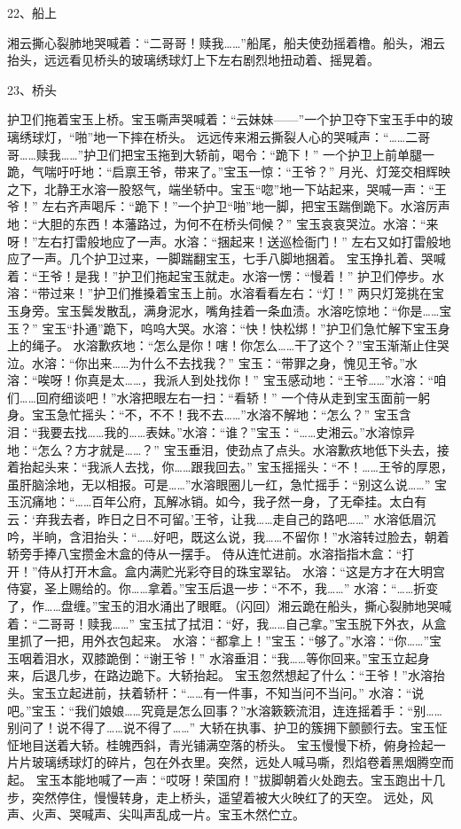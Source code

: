 22、船上\par
湘云撕心裂肺地哭喊着：“二哥哥！赎我……”船尾，船夫使劲摇着橹。船头，湘云抬头，远远看见桥头的玻璃绣球灯上下左右剧烈地扭动着、摇晃着。

23、桥头\par
护卫们拖着宝玉上桥。宝玉嘶声哭喊着：“云妹妹——”一个护卫夺下宝玉手中的玻璃绣球灯，“啪”地一下摔在桥头。
远远传来湘云撕裂人心的哭喊声：“……二哥哥……赎我……”护卫们把宝玉拖到大轿前，喝令：“跪下！”
一个护卫上前单腿一跪，气喘吁吁地：“启禀王爷，带来了。”宝玉一惊：“王爷？”
月光、灯笼交相辉映之下，北静王水溶一股怒气，端坐轿中。宝玉“唿”地一下站起来，哭喊一声：“王爷！”
左右齐声喝斥：“跪下！”一个护卫“啪”地一脚，把宝玉踹倒跪下。水溶厉声地：“大胆的东西！本藩路过，为何不在桥头伺候？”
宝玉哀哀哭泣。水溶：“来呀！”左右打雷般地应了一声。水溶：“捆起来！送巡检衙门！”
左右又如打雷般地应了一声。几个护卫过来，一脚踹翻宝玉，七手八脚地捆着。
宝玉挣扎着、哭喊着：“王爷！是我！”护卫们拖起宝玉就走。水溶一愣：“慢着！”
护卫们停步。水溶：“带过来！”护卫们推搡着宝玉上前。水溶看看左右：“灯！”
两只灯笼挑在宝玉身旁。宝玉鬓发散乱，满身泥水，嘴角挂着一条血渍。水溶吃惊地：“你是……宝玉？”
宝玉“扑通”跪下，呜呜大哭。水溶：“快！快松绑！”护卫们急忙解下宝玉身上的绳子。
水溶歉疚地：“怎么是你！嗐！你怎么……干了这个？”宝玉渐渐止住哭泣。水溶：“你出来……为什么不去找我？”
宝玉：“带罪之身，愧见王爷。”水溶：“唉呀！你真是太……，我派人到处找你！”
宝玉感动地：“王爷……”水溶：“咱们……回府细谈吧！”水溶把眼左右一扫：“看轿！”
一个侍从走到宝玉面前一躬身。宝玉急忙摇头：“不，不不！我不去……”水溶不解地：“怎么？”
宝玉含泪：“我要去找……我的……表妹。”水溶：“谁？”宝玉：“……史湘云。”水溶惊异地：“怎么？方才就是……？”
宝玉垂泪，使劲点了点头。水溶歉疚地低下头去，接着抬起头来：“我派人去找，你……跟我回去。”
宝玉摇摇头：“不！……王爷的厚恩，虽肝脑涂地，无以相报。可是……”水溶眼圈儿一红，急忙摇手：“别这么说……”
宝玉沉痛地：“……百年公府，瓦解冰销。如今，我孑然一身，了无牵挂。太白有云：‘弃我去者，昨日之日不可留。’王爷，让我……走自己的路吧……”
水溶低眉沉吟，半晌，含泪抬头：“……好吧，既这么说，我……不留你！”水溶转过脸去，朝着轿旁手捧八宝攒金木盒的侍从一摆手。
侍从连忙进前。水溶指指木盒：“打开！”侍从打开木盒。盒内满贮光彩夺目的珠宝翠钻。
水溶：“这是方才在大明宫侍宴，圣上赐给的。你……拿着。”宝玉后退一步：“不不，我……”
水溶：“……折变了，作……盘缠。”宝玉的泪水涌出了眼眶。（闪回）湘云跪在船头，撕心裂肺地哭喊着：“二哥哥！赎我……”
宝玉拭了拭泪：“好，我……自己拿。”宝玉脱下外衣，从盒里抓了一把，用外衣包起来。
水溶：“都拿上！”宝玉：“够了。”水溶：“你……”宝玉咽着泪水，双膝跪倒：“谢王爷！”
水溶垂泪：“我……等你回来。”宝玉立起身来，后退几步，在路边跪下。大轿抬起。
宝玉忽然想起了什么：“王爷！”水溶抬头。宝玉立起进前，扶着轿杆：“……有一件事，不知当问不当问。”
水溶：“说吧。”宝玉：“我们娘娘……究竟是怎么回事？”水溶簌簌流泪，连连摇着手：“别……别问了！说不得了……说不得了……”
大轿在执事、护卫的簇拥下颤颤行去。宝玉怔怔地目送着大轿。桂魄西斜，青光铺满空落的桥头。
宝玉慢慢下桥，俯身捡起一片片玻璃绣球灯的碎片，包在外衣里。突然，远处人喊马嘶，烈焰卷着黑烟腾空而起。
宝玉本能地喊了一声：“哎呀！荣国府！”拔脚朝着火处跑去。宝玉跑出十几步，突然停住，慢慢转身，走上桥头，遥望着被大火映红了的天空。
远处，风声、火声、哭喊声、尖叫声乱成一片。宝玉木然伫立。

